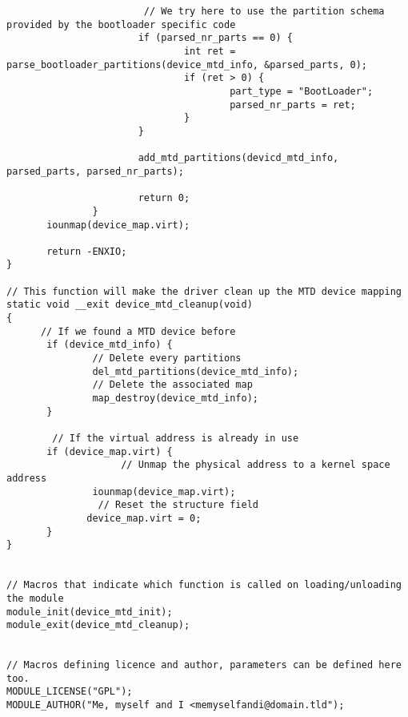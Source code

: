\begin{verbatim}
						// We try here to use the partition schema provided by the bootloader specific code
                       if (parsed_nr_parts == 0) {
                               int ret = parse_bootloader_partitions(device_mtd_info, &parsed_parts, 0);
                               if (ret > 0) {
                                       part_type = "BootLoader";
                                       parsed_nr_parts = ret;
                               }
                       }

                       add_mtd_partitions(devicd_mtd_info, parsed_parts, parsed_nr_parts);

                       return 0;
               }
       iounmap(device_map.virt);

       return -ENXIO;
}

// This function will make the driver clean up the MTD device mapping
static void __exit device_mtd_cleanup(void)
{
	  // If we found a MTD device before
       if (device_mtd_info) {
			   // Delete every partitions
               del_mtd_partitions(device_mtd_info);
			   // Delete the associated map
               map_destroy(device_mtd_info);
       }
	
		// If the virtual address is already in use
       if (device_map.virt) {
					// Unmap the physical address to a kernel space address
               iounmap(device_map.virt);
				// Reset the structure field
              device_map.virt = 0;
       }
}


// Macros that indicate which function is called on loading/unloading the module
module_init(device_mtd_init);
module_exit(device_mtd_cleanup);


// Macros defining licence and author, parameters can be defined here too.
MODULE_LICENSE("GPL");
MODULE_AUTHOR("Me, myself and I <memyselfandi@domain.tld");
\end{verbatim}
